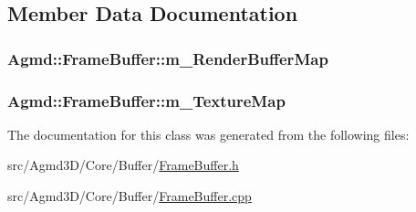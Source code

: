 \subsection{Member Data Documentation}
\hypertarget{class_agmd_1_1_frame_buffer_aae5914f57aa6d790bd89df6e016b2f04}{
\subsubsection[{m\+\_\+\+Render\+Buffer\+Map}]{ Agmd\+::\+Frame\+Buffer\+::m\+\_\+\+Render\+Buffer\+Map\hspace{0.3cm}{\ttfamily [protected]}}}\label{class_agmd_1_1_frame_buffer_aae5914f57aa6d790bd89df6e016b2f04}
\hypertarget{class_agmd_1_1_frame_buffer_a5a14e4858f1ddf4b213ec903d90b35ef}{
\subsubsection[{m\+\_\+\+Texture\+Map}]{ Agmd\+::\+Frame\+Buffer\+::m\+\_\+\+Texture\+Map\hspace{0.3cm}{\ttfamily [protected]}}}\label{class_agmd_1_1_frame_buffer_a5a14e4858f1ddf4b213ec903d90b35ef}


The documentation for this class was generated from the following files\+:\begin{DoxyCompactItemize}
\item 
src/\+Agmd3\+D/\+Core/\+Buffer/\hyperlink{_frame_buffer_8h}{Frame\+Buffer.\+h}\item 
src/\+Agmd3\+D/\+Core/\+Buffer/\hyperlink{_frame_buffer_8cpp}{Frame\+Buffer.\+cpp}\end{DoxyCompactItemize}
